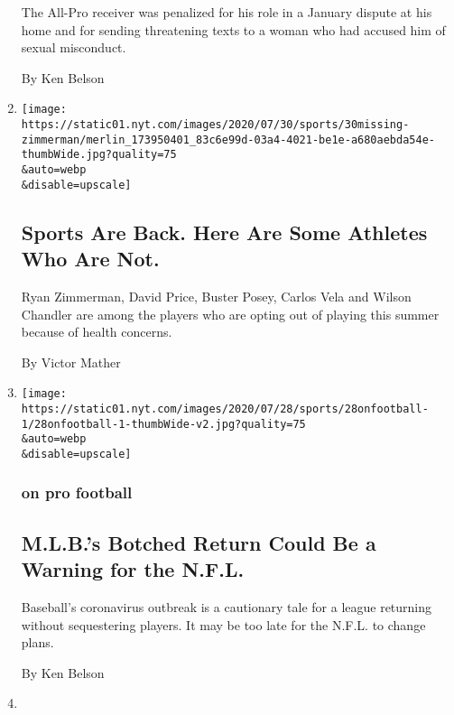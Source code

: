 \begin{enumerate}
  The All-Pro receiver was penalized for his role in a January dispute
  at his home and for sending threatening texts to a woman who had
  accused him of sexual misconduct.

  By Ken Belson
\item
  \href{/2020/07/30/sports/players-opt-out.html}{}

  \texttt{[image: https://static01.nyt.com/images/2020/07/30/sports/30missing-zimmerman/merlin\_173950401\_83c6e99d-03a4-4021-be1e-a680aebda54e-thumbWide.jpg?quality=75\\\&auto=webp\\\&disable=upscale]}

  \hypertarget{sports-are-back-here-are-some-athletes-who-are-not}{%
  \subsection{Sports Are Back. Here Are Some Athletes Who Are
  Not.}\label{sports-are-back-here-are-some-athletes-who-are-not}}

  Ryan Zimmerman, David Price, Buster Posey, Carlos Vela and Wilson
  Chandler are among the players who are opting out of playing this
  summer because of health concerns.

  By Victor Mather
\item
  \href{/2020/07/29/sports/football/nfl-mlb-opting-out.html}{}

  \texttt{[image: https://static01.nyt.com/images/2020/07/28/sports/28onfootball-1/28onfootball-1-thumbWide-v2.jpg?quality=75\\\&auto=webp\\\&disable=upscale]}

  \hypertarget{on-pro-football}{%
  \subsubsection{on pro football}\label{on-pro-football}}

  \hypertarget{mlbs-botched-return-could-be-a-warning-for-the-nfl}{%
  \subsection{M.L.B.'s Botched Return Could Be a Warning for the
  N.F.L.}\label{mlbs-botched-return-could-be-a-warning-for-the-nfl}}

  Baseball's coronavirus outbreak is a cautionary tale for a league
  returning without sequestering players. It may be too late for the
  N.F.L. to change plans.

  By Ken Belson
\item
  \href{/2020/07/25/sports/football/woody-johnson-trump-jets.html}{}


\end{enumerate}
